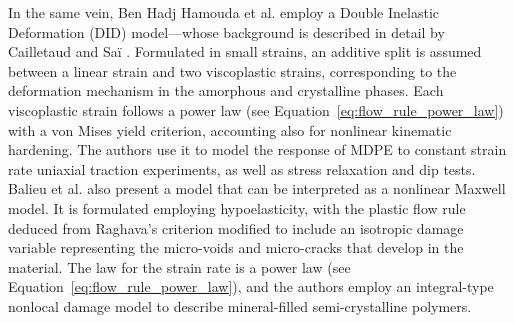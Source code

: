 In the same vein, Ben Hadj Hamouda et al. \citep{benhadjhamoudaViscoplasticBehaviourMedium2007} employ a Double Inelastic Deformation (DID) model---whose background is described in detail by Cailletaud and Saï \citep{cailletaudStudyPlasticViscoplastic1995}.
Formulated in small strains, an additive split is assumed between a linear strain and two viscoplastic strains, corresponding to the deformation mechanism in the amorphous and crystalline phases.
Each viscoplastic strain follows a power law (see Equation~\eqref{eq:flow_rule_power_law}) with a von Mises yield criterion, accounting also for nonlinear kinematic hardening.
The authors use it to model the response of MDPE to constant strain rate uniaxial traction experiments, as well as stress relaxation and dip tests.
Balieu et al. \citep{balieuNonassociatedViscoplasticityCoupled2014} also present a model that can be interpreted as a nonlinear Maxwell model.
It is formulated employing hypoelasticity, with the plastic flow rule deduced from Raghava's criterion modified to include an isotropic damage variable representing the micro-voids and micro-cracks that develop in the material.
The law for the strain rate is a power law (see Equation~\eqref{eq:flow_rule_power_law}), and the authors employ an integral-type nonlocal damage model to describe mineral-filled semi-crystalline polymers.

